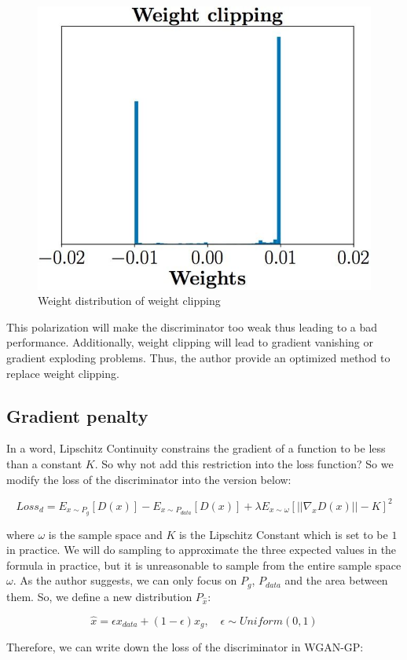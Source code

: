 \documentclass{article} %
\begin{document}
\begin{figure}[h]
	\centering
	\includegraphics[width=0.45\linewidth]{figures/weight_clipping.jpg}
	\caption{Weight distribution of weight clipping}
	\label{fig:weight_clipping}
\end{figure}

This polarization will make the discriminator too weak thus leading to a bad performance. Additionally, weight clipping will lead to gradient vanishing or gradient exploding problems. Thus, the author provide an optimized method to replace weight clipping.

\subsection{Gradient penalty}

In a word, Lipschitz Continuity constrains the gradient of a function to be less than a constant $K$. So why not add this restriction into the loss function? So we modify the loss of the discriminator into the version below:

\begin{equation}
    Loss_d = E_{x \sim P_g}[D(x)]-E_{x \sim P_{data}}[D(x)]+\lambda E_{x \sim \omega}[||\nabla_x D(x)|| - K]^2
\end{equation}

where $\omega$ is the sample space and $K$ is the Lipschitz Constant which is set to be $1$ in practice. We will do sampling to approximate the three expected values in the formula in practice, but it is unreasonable to sample from the entire sample space $\omega$. As the author suggests, we can only focus on $P_g$, $P_{data}$ and the area between them. So, we define a new distribution $P_{\hat{x}}$:

\begin{equation}
    \hat{x} = \epsilon x_{data} + (1-\epsilon)x_g,\quad \epsilon \sim Uniform(0,1)
\end{equation}

Therefore, we can write down the loss of the discriminator in WGAN-GP:
\end{document}
